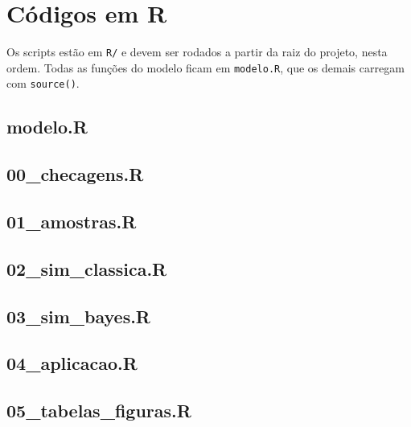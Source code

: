 \documentclass[11pt,a4paper]{article}
\begin{document}
\appendix
\section{Códigos em R}

Os scripts estão em \texttt{R/} e devem ser rodados a partir da raiz do projeto, nesta ordem. Todas as funções do modelo ficam em \texttt{modelo.R}, que os demais carregam com \texttt{source()}.

\subsection*{modelo.R}
\subsection*{00\_checagens.R}
\subsection*{01\_amostras.R}
\subsection*{02\_sim\_classica.R}
\subsection*{03\_sim\_bayes.R}
\subsection*{04\_aplicacao.R}
\subsection*{05\_tabelas\_figuras.R}
\end{document}
